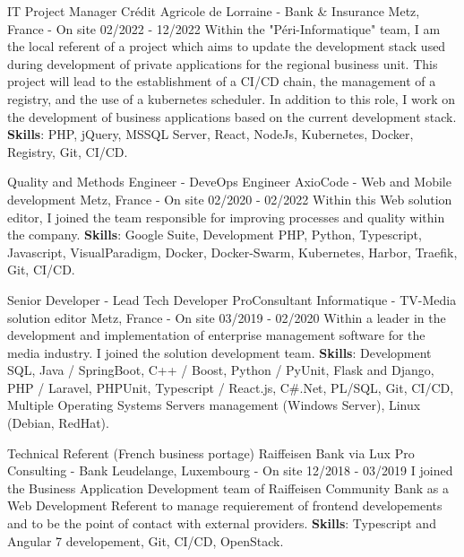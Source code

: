 \begin{cventries}
  \cventry
    {IT Project Manager} %
    {Crédit Agricole de Lorraine - Bank \& Insurance} %
    {Metz, France - On site} %
    {02/2022 - 12/2022} %
    {
        Within the "Péri-Informatique" team, I am the local referent of a project which aims to
        update the development stack used during development of private applications for the
        regional business unit.
        \newline
        This project will lead to the establishment of a CI/CD chain, the management of a 
        registry, and the use of a kubernetes scheduler.
        \newline
        In addition to this role, I work on the development of business applications based 
        on the current development stack.
        \newline
        \textbf{Skills}: PHP, jQuery, MSSQL Server, React, NodeJs, Kubernetes, Docker, Registry, Git, CI/CD.
    }

  \cventry
    {Quality and Methods Engineer - DeveOps Engineer} %
    {AxioCode - Web and Mobile development} %
    {Metz, France - On site} %
    {02/2020 - 02/2022} %
    {
        Within this Web solution editor, I joined the team responsible for improving processes and quality within the company.
        \newline
        \textbf{Skills}: Google Suite, Development PHP, Python, Typescript, Javascript, VisualParadigm, Docker, Docker-Swarm, Kubernetes, Harbor, Traefik, Git, CI/CD.
    }

  \cventry
    {Senior Developer - Lead Tech Developer} %
    {ProConsultant Informatique - TV-Media solution editor} %
    {Metz, France - On site} %
    {03/2019 - 02/2020} %
    {
        Within a leader in the development and implementation of enterprise management software for the media industry. I joined the solution development team.
        \newline
        \textbf{Skills}: Development SQL, Java / SpringBoot, C++ / Boost, Python / PyUnit, Flask and Django, PHP / Laravel, PHPUnit, Typescript / React.js, C\#.Net, PL/SQL, Git, CI/CD, Multiple Operating Systems Servers management (Windows Server), Linux (Debian, RedHat).
    }

  \cventry
    {Technical Referent (French business portage)} %
    {Raiffeisen Bank via Lux Pro Consulting - Bank} %
    {Leudelange, Luxembourg - On site} %
    {12/2018 - 03/2019} %
    {
        I joined the Business Application Development team of Raiffeisen Community Bank 
        as a Web Development Referent to manage requierement of frontend developements 
        and to be the point of contact with external providers.
        \newline
        \textbf{Skills}: Typescript and Angular 7 developement, Git, CI/CD, OpenStack.
    }


\end{cventries}
